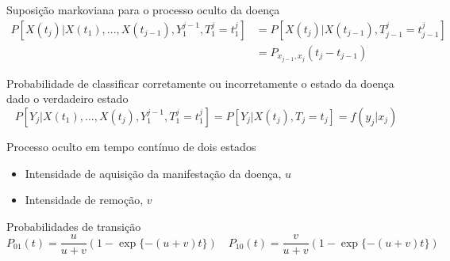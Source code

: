 \documentclass[ignorenonframetext,]{beamer}
\begin{document}
\begin{frame}

\vspace{.3cm}

\pause

\begin{block}{Suposição markoviana para o processo oculto da doença}
 \vspace{-.45cm}
 \footnotesize
 \[\begin{aligned}
   P[X(t_{j})|X(t_{1}), ..., X(t_{j-1}), Y_{1}^{j-1},
   T_{1}^{j} = t_{1}^{j}] & = P[X(t_{j})|X(t_{j-1}),
                              T_{j-1}^{j} = t_{j-1}^{j}] \\
                          & = P_{x_{j-1}, x_{j}}(t_{j} - t_{j-1})
   \end{aligned}\]
\end{block}

\vspace{.6cm}

\pause

\begin{block}{Probabilidade de classificar corretamente ou
              incorretamente o estado da doença dado o verdadeiro
              estado}
 \vspace{-.45cm}
 \footnotesize
 \[P[Y_{j}|X(t_{1}), ..., X(t_{j}), Y_{1}^{j-1}, T_{1}^{j} = t_{1}^{j}]
   = P[Y_{j}|X(t_{j}), T_{j} = t_{j}] = f(y_{j}|x_{j})\]
\end{block}

\end{frame}

\begin{frame}

\vspace{.35cm}\begin{block}{Processo oculto em tempo contínuo de dois estados}
 \vspace{-.25cm}
 \begin{itemize}
  \pause \item Intensidade de aquisição da manifestação da doença, \(u\)
  \pause \item Intensidade de remoção, \(v\)
 \end{itemize}
\end{block}

\vspace{.5cm}

\pause

\begin{block}{Probabilidades de transição}
 \vspace{-.5cm}
 \small
 \[P_{01}(t) = \frac{u}{u+v}(1-\exp\{-(u+v)t\}) \quad
   P_{10}(t) = \frac{v}{u+v}(1-\exp\{-(u+v)t\})\]
\end{block}

\end{frame}
\end{document}
